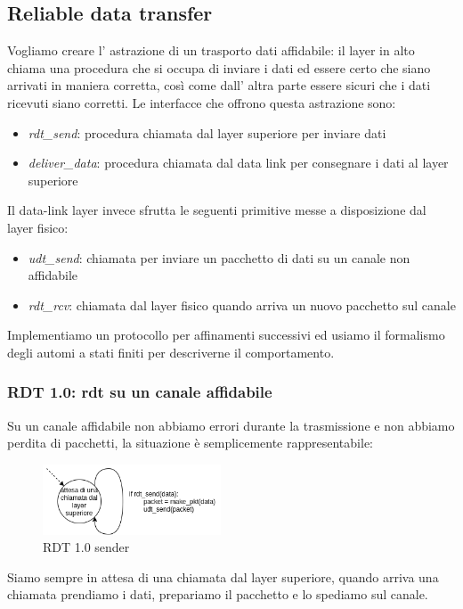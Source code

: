 \subsection{Reliable data transfer}
Vogliamo creare l' astrazione di un trasporto dati affidabile: il layer in alto chiama una procedura che si occupa di inviare i dati ed essere certo che siano arrivati in maniera corretta, così come dall' altra parte essere sicuri che i dati ricevuti siano corretti.
Le interfacce che offrono questa astrazione sono:
\begin{itemize}
    \item \emph{rdt\_send}: procedura chiamata dal layer superiore per inviare dati
    \item \emph{deliver\_data}: procedura chiamata dal data link per consegnare i dati al layer superiore
\end{itemize}
Il data-link layer invece sfrutta le seguenti primitive messe a disposizione dal layer fisico:
\begin{itemize}
    \item \emph{udt\_send}: chiamata per inviare un pacchetto di dati su un canale non affidabile
    \item \emph{rdt\_rcv}: chiamata dal layer fisico quando arriva un nuovo pacchetto sul canale
\end{itemize}

Implementiamo un protocollo per affinamenti successivi ed usiamo il formalismo degli automi a stati finiti per descriverne il comportamento.


\subsubsection{RDT 1.0: rdt su un canale affidabile}
Su un canale affidabile non abbiamo errori durante la trasmissione e non abbiamo perdita di pacchetti, la situazione è semplicemente rappresentabile:
\begin{figure}[H]
    \centering
    \includegraphics[width=200px]{images/3_Reti_connessione_diretta/rdt_1.0_sender.png}
    \caption{RDT 1.0 sender}
\end{figure}
Siamo sempre in attesa di una chiamata dal layer superiore, quando arriva una chiamata prendiamo i dati, prepariamo il pacchetto e lo spediamo sul canale.

